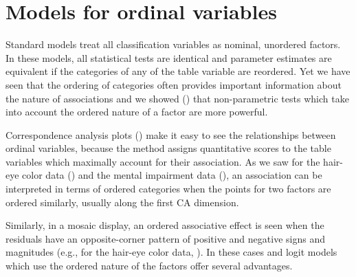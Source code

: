 \documentclass[11pt]{book}\usepackage[]{graphicx}\usepackage[]{color}
\begin{document}
\section{Models for ordinal variables}\label{sec:loglin-ordinal}

Standard \loglin models treat all classification variables as
nominal, unordered factors. In these models,
all statistical tests are identical
and parameter estimates are equivalent
if the categories of any of the table variable are reordered.
Yet we have seen that the ordering of categories often provides
important information about the nature of associations
and we showed () that non-parametric
tests which take into account the ordered nature of a factor
are more powerful.

Correspondence analysis plots () make it easy
to see the relationships between ordinal variables, because
the method assigns quantitative scores to the table variables
which maximally account for their association.
As we saw for the hair-eye color data ()
and the mental impairment data (),
an association can be interpreted in terms of ordered categories
when the points for two factors are ordered similarly, usually
along the first CA dimension.

Similarly, in a mosaic display, an ordered associative effect is seen when
the residuals have an opposite-corner pattern of positive and negative
signs and magnitudes (e.g., for the hair-eye color data,
%
).
In these cases \loglin and logit models which use the ordered nature of the factors
offer several advantages.
\end{document}
